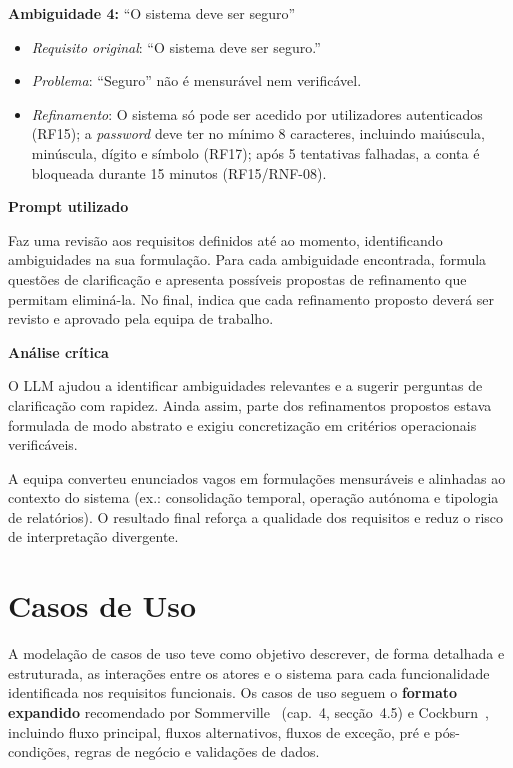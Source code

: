     \textbf{Ambiguidade 4:} ``O sistema deve ser seguro''
    \begin{itemize}
        \item \textit{Requisito original}: ``O sistema deve ser seguro.''
        \item \textit{Problema}: ``Seguro'' não é mensurável nem verificável.
        \item \textit{Refinamento}: O sistema só pode ser acedido por utilizadores autenticados (RF15); a \textit{password} deve ter no mínimo 8 caracteres, incluindo maiúscula, minúscula, dígito e símbolo (RF17); após 5 tentativas falhadas, a conta é bloqueada durante 15 minutos (RF15/RNF-08).
    \end{itemize}

    \begin{tcolorbox}[title=Interação com o LLM]
    \textbf{Prompt utilizado}

    Faz uma revisão aos requisitos definidos até ao momento, identificando ambiguidades na sua formulação. Para cada ambiguidade encontrada, formula questões de clarificação e apresenta possíveis propostas de refinamento que permitam eliminá-la. No final, indica que cada refinamento proposto deverá ser revisto e aprovado pela equipa de trabalho.

    \tcblower

    \textbf{Análise crítica}

    O LLM ajudou a identificar ambiguidades relevantes e a sugerir perguntas de clarificação com rapidez. Ainda assim, parte dos refinamentos propostos estava formulada de modo abstrato e exigiu concretização em critérios operacionais verificáveis.

    A equipa converteu enunciados vagos em formulações mensuráveis e alinhadas ao contexto do sistema (ex.: consolidação temporal, operação autónoma e tipologia de relatórios). O resultado final reforça a qualidade dos requisitos e reduz o risco de interpretação divergente.
    \end{tcolorbox}

\section{Casos de Uso}

    A modelação de casos de uso teve como objetivo descrever, de forma detalhada e estruturada, as interações entre os atores e o sistema para cada funcionalidade identificada nos requisitos funcionais. Os casos de uso seguem o \textbf{formato expandido} recomendado por Sommerville~\cite{sommerville2016} (cap.~4, secção~4.5) e Cockburn~\cite{cockburn2001}, incluindo fluxo principal, fluxos alternativos, fluxos de exceção, pré e pós-condições, regras de negócio e validações de dados.

